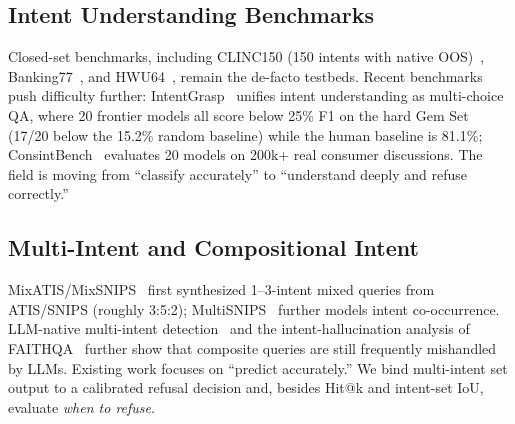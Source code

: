 \documentclass[sigconf, anonymous, review]{acmart}
\begin{document}
\subsection{Intent Understanding Benchmarks}
Closed-set benchmarks, including CLINC150 (150 intents with native OOS)~\citep{clinc150}, Banking77~\citep{banking77}, and HWU64~\citep{hwun18}, remain the de-facto testbeds. Recent benchmarks push difficulty further: IntentGrasp~\citep{intentgrasp} unifies intent understanding as multi-choice QA, where 20 frontier models all score below 25\% F1 on the hard Gem Set (17/20 below the 15.2\% random baseline) while the human baseline is 81.1\%; ConsintBench~\citep{consintbench} evaluates 20 models on 200k+ real consumer discussions. The field is moving from ``classify accurately'' to ``understand deeply and refuse correctly.''

\subsection{Multi-Intent and Compositional Intent}
MixATIS/MixSNIPS~\citep{mixatis,mixsnips} first synthesized 1--3-intent mixed queries from ATIS/SNIPS (roughly 3:5:2); MultiSNIPS~\citep{agif} further models intent co-occurrence. LLM-native multi-intent detection~\citep{midlm} and the intent-hallucination analysis of FAITHQA~\citep{faithqa} further show that composite queries are still frequently mishandled by LLMs. Existing work focuses on ``predict accurately.'' We bind multi-intent set output to a calibrated refusal decision and, besides Hit@k and intent-set IoU, evaluate \emph{when to refuse}.
\end{document}
